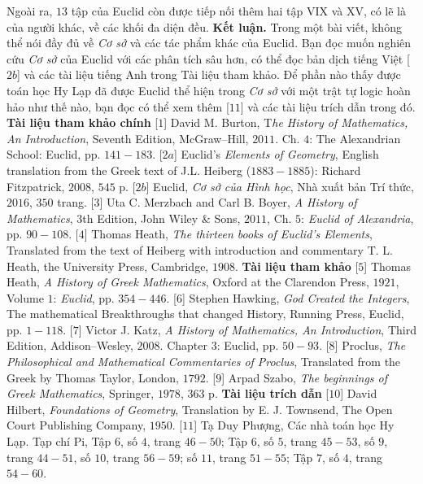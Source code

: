 \begin{multicols}{2}
	\vskip 0.1cm
	Ngoài ra, $13$ tập của Euclid còn được tiếp nối thêm hai tập VIX và XV, có lẽ là của người khác, về các khối đa diện đều.     
	\vskip 0.1cm
	\textbf{\color{lichsutoanhoc}Kết luận.} Trong một bài viết, không thể nói đầy đủ về \textit{Cơ sở} và các tác phẩm khác của Euclid. Bạn đọc muốn nghiên cứu \textit{Cơ sở} của Euclid với các phân tích sâu hơn, có thể đọc bản dịch tiếng Việt [$2b$] và các tài liệu tiếng Anh trong Tài liệu tham khảo. Để phần nào thấy được toán học Hy Lạp đã được Euclid thể hiện trong \textit{Cơ sở} với một trật tự logic hoàn hảo như thế nào, bạn đọc có thể xem thêm [$11$] và các tài liệu trích dẫn trong đó. 
	\vskip 0.1cm
	\textbf{\color{lichsutoanhoc}Tài liệu tham khảo chính}
	\vskip 0.1cm
	[$1$] David M. Burton, T\textit{he History of Mathematics, An Introduction}, Seventh Edition, McGraw--Hill, $2011$. Ch. $4$: The Alexandrian School: Euclid, pp. $141-183$.
	\vskip 0.1cm
	[$2a$] Euclid's \textit{Elements of Geometry}, English translation from the Greek text of J.L. Heiberg ($1883-1885$): Richard Fitzpatrick, $2008$, $545$ p.
	\vskip 0.1cm
	[$2b$] Euclid, \textit{Cơ sở của Hình học}, Nhà xuất bản Trí thức, $2016$, $350$ trang.
	\vskip 0.1cm
	[$3$] Uta C. Merzbach and Carl B. Boyer, \textit{A
	History of Mathematics}, $3$th Edition, John Wiley \& Sons, $2011$, Ch. $5$: \textit{Euclid of Alexandria}, pp. $90-108$.
	\vskip 0.1cm
	[$4$] Thomas Heath, \textit{The thirteen books of Euclid’s Elements}, Translated from the text of Heiberg with introduction and commentary T. L. Heath, the University Press, Cambridge, $1908$.
	\vskip 0.1cm   
	\columnbreak
	\textbf{\color{lichsutoanhoc}Tài liệu tham khảo}
	\vskip 0.1cm
	[$5$] Thomas Heath, \textit{A History of Greek Mathematics}, Oxford at the Clarendon Press, $1921$, Volume $1$: \textit{Euclid}, pp. $354-446$.
	\vskip 0.1cm   
	[$6$] Stephen Hawking, \textit{God Created the Integers}, The mathematical Breakthroughs that changed History, Running Press, Euclid, pp. $1-118$.   
	\vskip 0.1cm
	[$7$] Victor J. Katz, \textit{A History of Mathematics, An Introduction}, Third Edition, Addison--Wesley, $2008$. Chapter $3$: Euclid, pp. $50-93$.
	\vskip 0.1cm
	[$8$] Proclus, \textit{The Philosophical and Mathematical Commentaries of Proclus}, Translated from the Greek by Thomas Taylor, London, $1792$.
	\vskip 0.1cm   
	[$9$] Arpad Szabo, \textit{The beginnings of Greek Mathematics}, Springer, $1978$, $363$ p.
	\vskip 0.1cm
	\textbf{\color{lichsutoanhoc}Tài liệu trích dẫn}
	\vskip 0.1cm
	[$10$] David Hilbert, \textit{Foundations of Geometry}, Translation by E. J. Townsend, The Open Court Publishing Company, $1950$.
	\vskip 0.1cm
	[$11$] Tạ Duy Phượng, Các nhà toán học Hy Lạp. Tạp chí Pi, Tập $6$, số $4$, trang $46-50$; Tập $6$, số $5$, trang $45-53$, số $9$, trang $44-51$, số $10$, trang $56-59$; số $11$, trang $51-55$; Tập $7$, số $4$, trang $54-60$.
\end{multicols}